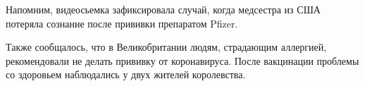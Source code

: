 Напомним, видеосьемка зафиксировала случай, когда медсестра из США потеряла
сознание после прививки препаратом Pfizer.

Также сообщалось, что в Великобритании людям, страдающим аллергией,
рекомендовали не делать прививку от коронавируса. После вакцинации проблемы со
здоровьем наблюдались у двух жителей королевства.
